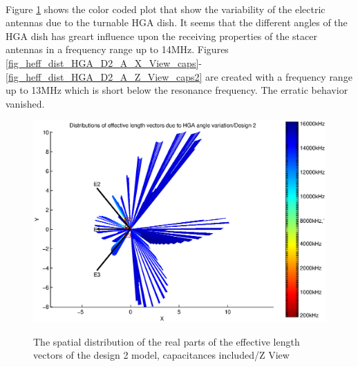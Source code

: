 \documentclass[a4paper,10pt]{thesis}
\begin{document}
\paragraph*{}
Figure \ref{fig_heff_dist_HGA_D2_A_Z_View_caps} shows the color coded plot that show the variability of the electric antennas due to the turnable HGA dish. It seems that the different angles of the HGA dish has greart influence upon the receiving properties of the stacer antennas in a frequency range up to 14MHz. Figures \ref{fig_heff_dist_HGA_D2_A_X_View_caps}-\ref{fig_heff_dist_HGA_D2_A_Z_View_caps2} are created with a frequency range up to 13MHz which is short below the resonance frequency. The erratic behavior vanished.\\

\begin{figure}
\begin{center}
\includegraphics[width=12cm]{HeffVerteilungHGAD2-ZView_caps.eps} \\
\caption{The spatial distribution of the real parts of the effective length vectors of the design 2 model, capacitances included/Z View}\label{fig_heff_dist_HGA_D2_A_Z_View_caps}
\end{center}
\end{figure}
\end{document}
